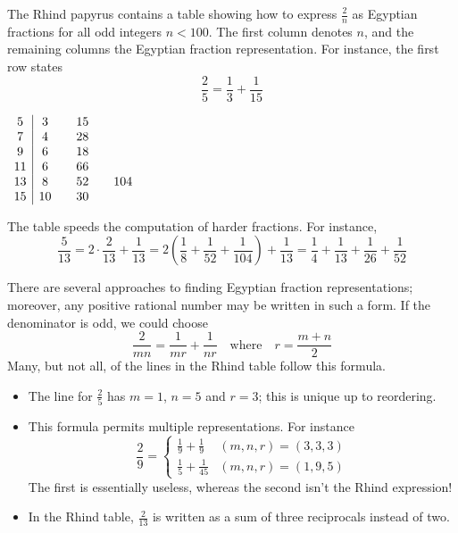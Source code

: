 \begin{minipage}[t]{0.7\linewidth}\vspace{0pt}
	The Rhind papyrus contains a table showing how to express $\frac 2n$ as Egyptian fractions for all odd integers $n<100$. The first column denotes $n$, and the remaining columns the Egyptian fraction representation. For instance, the first row states
	\[
		\frac 25=\frac 13+\frac 1{15}
	\] 
\end{minipage}
\hfill
\begin{minipage}[t]{0.29\linewidth}\vspace{0pt}
	\hfill
	$\begin{array}{c|cccccc@{}}
		5&3&&15&&&\\
		7&4&&28&&&\\
		9&6&&18&&&\\
		11&6&&66&&&\\
		13&8&&52&&104&\\
		15&10&&30&&&%
	\end{array}$
\end{minipage}
\smallbreak
The table speeds the computation of harder fractions. For instance,\label{ex:rhinddivide}
\[
	\frac 5{13} =2\cdot\frac 2{13}+\frac 1{13} =2\left(\frac 18+\frac 1{52}+\frac 1{104}\right)+\frac 1{13} =\frac 14+\frac 1{13}+\frac 1{26}+\frac 1{52}
\]

There are several approaches to finding Egyptian fraction representations; moreover, any positive rational number may be written in such a form. If the denominator is odd, we could choose
\[
	\frac 2{mn}=\frac 1{mr}+\frac 1{nr}\quad\text{where}\quad r=\frac{m+n}2
\]
Many, but not all, of the lines in the Rhind table follow this formula.
\begin{itemize}
  \item The line for $\frac 25$ has $m=1$, $n=5$ and $r=3$; this is unique up to reordering.
  \item This formula permits multiple representations. For instance
  \[
  	\frac 29=
  	\begin{cases}
  		\frac 19+\frac 19&(m,n,r)=(3,3,3)\\
  		\frac 15+\frac 1{45}&(m,n,r)=(1,9,5) 	
  	\end{cases}
  \]
  The first is essentially useless, whereas the second isn't the Rhind expression!
  \item In the Rhind table, $\frac 2{13}$ is written as a sum of three reciprocals instead of two.
\end{itemize}


